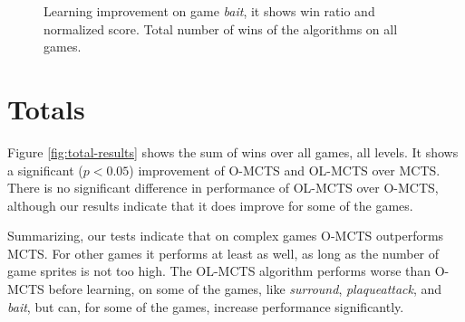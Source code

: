 \begin{figure}
	\centering
	\caption{Learning improvement on game \textit{bait}, it shows win ratio and
		normalized score. Total number of wins of the algorithms on
	all games.}
\end{figure}

\section{Totals}
\label{subsec:totals}
Figure \ref{fig:total-results} shows the sum of wins over all games, all levels.
It shows a significant ($p < 0.05$) improvement of O-MCTS and OL-MCTS over MCTS.
There is no significant difference in performance of OL-MCTS over O-MCTS,
although our results indicate that it does improve for some of the games.

Summarizing, our tests indicate that on complex games O-MCTS outperforms MCTS.
For other games it performs at least as well, as long as the number of game
sprites is not too high. 
The OL-MCTS algorithm performs worse than O-MCTS before learning, on some of the
games, like \textit{surround}, \textit{plaqueattack}, and \textit{bait}, but
can, for some of the games, increase performance significantly.
